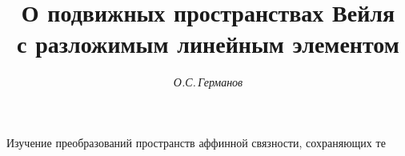 

 


% 


\newcommand{\up}[2]{\overset{#1}{#2}{}} 


\newcommand{\tts}[1]{} 


 




\setcounter{page}{19} 












 


\author{\it О.С.\,Германов} 




\title{О подвижных пространствах Вейля\\ с разложимым линейным элементом} 


 


\date{} 




\pagestyle{plain} %


 




\maketitle 


\label{begin} 


 


Изучение преобразований пространств аффинной связности, сохраняющих те 


